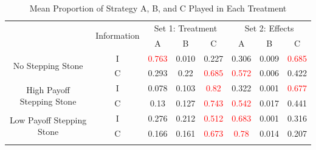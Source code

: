 \begin{table}[h]
\centering
\caption{Mean Proportion of Strategy A, B, and C Played in Each Treatment}
\label{tab:propstratall}
\begin{tabular}{ c c c c c c c c} 
\Xhline{.1em}
\multirow{2}{8em}{Game} & \multirow{2}{5em}{Information} & \multicolumn{3}{c}{Set 1: Treatment} & \multicolumn{3}{c}{Set 2: Effects}\\
& & A & B & C & A & B & C \\
\hline
\multirow{2}{8em}{No Stepping Stone} & I &  \textcolor{red}{0.763} & 0.010 & 0.227 & 0.306 & 0.009 & \textcolor{red}{0.685}\\ 
 & C & 0.293 & 0.22 & \textcolor{red}{0.685} & \textcolor{red}{0.572} & 0.006 & 0.422 \\  
\multirow{2}{8em}{High Payoff Stepping Stone} & I & 0.078 & 0.103 & \textcolor{red}{0.82} & 0.322 & 0.001 & \textcolor{red}{0.677}\\ 
 & C & 0.13 & 0.127 & \textcolor{red}{0.743} & \textcolor{red}{0.542} & 0.017 & 0.441\\  
\multirow{2}{8em}{Low Payoff Stepping Stone} & I & 0.276 & 0.212 & \textcolor{red}{0.512} & \textcolor{red}{0.683} & 0.001 & 0.316\\ 
 & C & 0.166 & 0.161 & \textcolor{red}{0.673} & \textcolor{red}{0.78} & 0.014 & 0.207\\  
\Xhline{.1em}
\end{tabular}
\end{table}%

